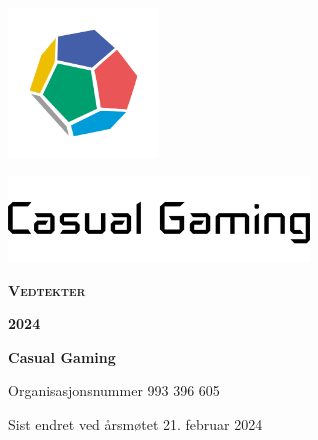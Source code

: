 \begin{titlepage}
    \centering
    \vspace*{1cm}
    \includegraphics[width=4cm]{innhold/logo-terning.png}\par
    \includegraphics[width=8cm]{innhold/logo-tekst.png}\par
    \vspace*{4cm}
    {\rmfamily\Huge\bfseries\scshape Vedtekter}\par
    \vspace*{0.5cm}
    {\rmfamily\LARGE\bfseries\scshape 2024}\par
    \vfill
    {\bfseries Casual Gaming}\par
    \vspace*{0.5cm}
    {Organisasjonsnummer 993 396 605}\par
    \vspace*{0.5cm}
    {Sist endret ved årsmøtet 21. februar 2024}\par
\end{titlepage}
